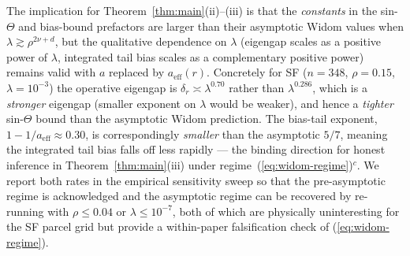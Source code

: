 The implication for Theorem~\ref{thm:main}(ii)--(iii) is that the
\emph{constants} in the sin-$\Theta$ and bias-bound prefactors are larger than
their asymptotic Widom values when $\lambda\gtrsim\rho^{2\nu+d}$, but the
qualitative dependence on $\lambda$ (eigengap scales as a positive power of
$\lambda$, integrated tail bias scales as a complementary positive power)
remains valid with $a$ replaced by $a_{\mathrm{eff}}(r)$. Concretely for SF
($n=348$, $\rho=0.15$, $\lambda=10^{-3}$) the operative eigengap is
$\delta_r\asymp\lambda^{0.70}$ rather than $\lambda^{0.286}$, which is a
\emph{stronger} eigengap (smaller exponent on $\lambda$ would be weaker), and
hence a \emph{tighter} sin-$\Theta$ bound than the asymptotic Widom prediction.
The bias-tail exponent, $1-1/a_{\mathrm{eff}}\approx 0.30$, is correspondingly
\emph{smaller} than the asymptotic $5/7$, meaning the integrated tail bias
falls off less rapidly --- the binding direction for honest inference in
Theorem~\ref{thm:main}(iii) under regime~(\ref{eq:widom-regime})$^c$. We
report both rates in the empirical sensitivity sweep so that the
pre-asymptotic regime is acknowledged and the asymptotic regime can be
recovered by re-running with $\rho\le 0.04$ or $\lambda\le 10^{-7}$, both of
which are physically uninteresting for the SF parcel grid but provide a
within-paper falsification check of (\ref{eq:widom-regime}).
